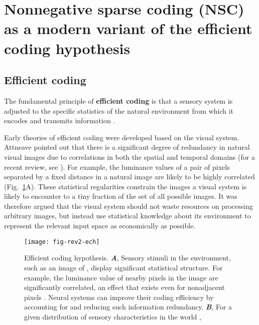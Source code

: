 \section*{Nonnegative sparse coding (NSC) as a modern variant of the efficient coding hypothesis}

\subsection*{Efficient coding}

The fundamental principle of \textbf{efficient coding}
is that a sensory system is
adjusted to the specific statistics of the natural environment from which
it encodes and transmits information
\cite{Barlow1961,Attneave1954,Linsker1990,LouieGlimcher2012}.

Early theories of efficient coding
\cite{Barlow1961,Attneave1954}
were developed based on the visual system.
Attneave \cite{Attneave1954} pointed out that there is a significant
degree of redundancy in natural visual images due to correlations in both
the spatial and temporal domains
(for a recent review, see \cite{SimoncelliOlshausen2001}).
For example, the luminance values of a pair of pixels
separated by a fixed distance in a natural image
are likely to be highly correlated
(Fig.~\ref{fig:ech}A).
These statistical regularities constrain the images a visual system
is likely to encounter to a tiny fraction of the set of all
possible images.
It was therefore argued that the visual system should not
waste resources on processing arbitrary images,
but instead use statistical knowledge
about its environment to represent the relevant input space 
as economically as possible.


\begin{figure}[h]
	\centering
	\texttt{[image: fig-rev2-ech]}
    \caption{Efficient coding hypothesis.
    \textbf{\emph{A}},
         Sensory stimuli in the environment, such as an image of ,
         display significant statistical structure. For example, the luminance
         value of nearby pixels in the image are significantly correlated,
         an effect that exists even for nonadjacent pixels .
         Neural systems can improve their coding efficiency by accounting
         for and reducing such information redundancy.
     \textbf{\emph{B}},
         For a given distribution of sensory characteristics in the world ,
    }
	\label{fig:ech}
\end{figure}


